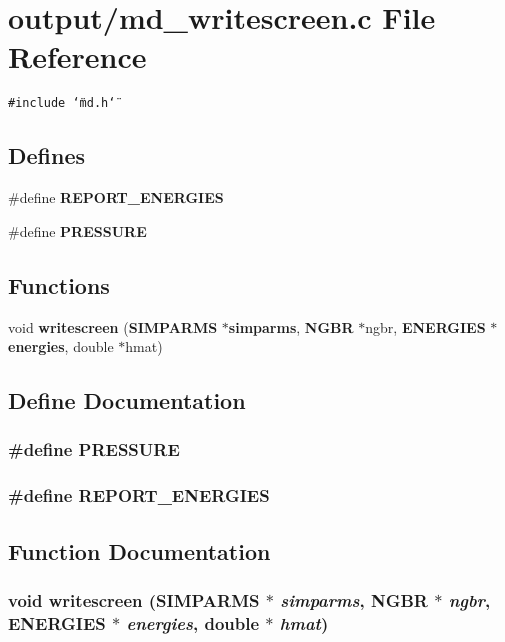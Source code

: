 \section{output/md\_\-writescreen.c File Reference}
\label{md__writescreen_8c}
{\tt \#include \char`\"{}md.h\char`\"{}}\par
\subsection*{Defines}
\begin{CompactItemize}
\item 
\#define {\bf REPORT\_\-ENERGIES}
\item 
\#define {\bf PRESSURE}
\end{CompactItemize}
\subsection*{Functions}
\begin{CompactItemize}
\item 
void {\bf writescreen} ({\bf SIMPARMS} $\ast${\bf simparms}, {\bf NGBR} $\ast$ngbr, {\bf ENERGIES} $\ast${\bf energies}, double $\ast$hmat)
\end{CompactItemize}


\subsection{Define Documentation}
\subsubsection{\setlength{\rightskip}{0pt plus 5cm}\#define PRESSURE}\label{md__writescreen_8c_67bafb91da1f123097b90c52747bcf36}


\subsubsection{\setlength{\rightskip}{0pt plus 5cm}\#define REPORT\_\-ENERGIES}\label{md__writescreen_8c_aacff96ac03170bc108cba407dfec6b3}




\subsection{Function Documentation}
\subsubsection{\setlength{\rightskip}{0pt plus 5cm}void writescreen ({\bf SIMPARMS} $\ast$ {\em simparms}, {\bf NGBR} $\ast$ {\em ngbr}, {\bf ENERGIES} $\ast$ {\em energies}, double $\ast$ {\em hmat})}\label{md__writescreen_8c_bc0a6ecaeb8b4d7ebbf7aacc098ed44a}


